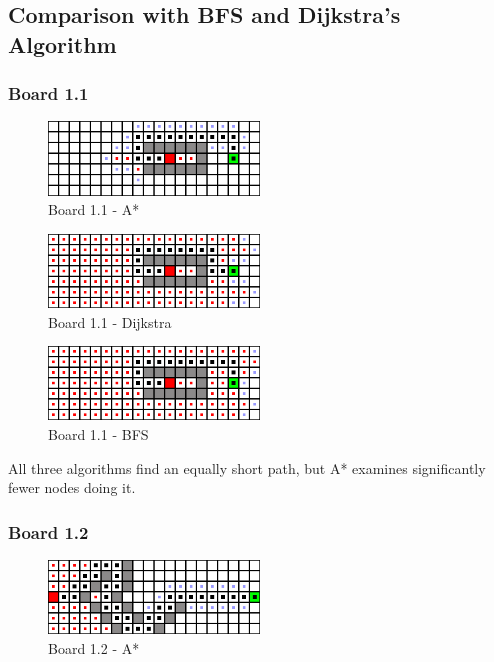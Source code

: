 \newpage

\subsection*{Comparison with BFS and Dijkstra's Algorithm}

\subsubsection*{Board 1.1}

\begin{figure}[h!]
  \centering
    \includegraphics[width=0.5\textwidth]{img/board-1-1-astar}
    \caption{Board 1.1 - A*}
\end{figure}

\begin{figure}[h!]
  \centering
    \includegraphics[width=0.5\textwidth]{img/board-1-1-dijkstra}
    \caption{Board 1.1 - Dijkstra}
\end{figure}

\begin{figure}[h!]
  \centering
    \includegraphics[width=0.5\textwidth]{img/board-1-1-bfs}
    \caption{Board 1.1 - BFS}
\end{figure}

All three algorithms find an equally short path, but A* examines significantly
fewer nodes doing it.

\newpage

\subsubsection*{Board 1.2}

\begin{figure}[h!]
  \centering
    \includegraphics[width=0.5\textwidth]{img/board-1-2-astar}
    \caption{Board 1.2 - A*}
\end{figure}

